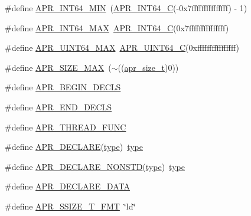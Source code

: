\begin{DoxyCompactItemize}
\item 
\#define \hyperlink{group__apr__platform_gaf371ae92dbf0fed20801cf279cd85f1a}{A\+P\+R\+\_\+\+I\+N\+T64\+\_\+\+M\+IN}~(\hyperlink{group__apr__platform_gaae749817bb595cd5dcb9c17c119ddb13}{A\+P\+R\+\_\+\+I\+N\+T64\+\_\+C}(-\/0x7fffffffffffffff) -\/ 1)
\item 
\#define \hyperlink{group__apr__platform_ga3b25669924dcfa853cd6ea3395c8717f}{A\+P\+R\+\_\+\+I\+N\+T64\+\_\+\+M\+AX}~\hyperlink{group__apr__platform_gaae749817bb595cd5dcb9c17c119ddb13}{A\+P\+R\+\_\+\+I\+N\+T64\+\_\+C}(0x7fffffffffffffff)
\item 
\#define \hyperlink{group__apr__platform_ga2d20379176b15b8b0598992df3def796}{A\+P\+R\+\_\+\+U\+I\+N\+T64\+\_\+\+M\+AX}~\hyperlink{group__apr__platform_gaede133b7384b6a7a08c51cf1fa9c4001}{A\+P\+R\+\_\+\+U\+I\+N\+T64\+\_\+C}(0xffffffffffffffff)
\item 
\#define \hyperlink{group__apr__platform_gab5865d64b134a3924014837dd44627a7}{A\+P\+R\+\_\+\+S\+I\+Z\+E\+\_\+\+M\+AX}~($\sim$((\hyperlink{group__apr__platform_gaaa72b2253f6f3032cefea5712a27540e}{apr\+\_\+size\+\_\+t})0))
\item 
\#define \hyperlink{group__apr__platform_gaa046c9c51a1af394db3a34dec1972630}{A\+P\+R\+\_\+\+B\+E\+G\+I\+N\+\_\+\+D\+E\+C\+LS}
\item 
\#define \hyperlink{group__apr__platform_ga32d22bd9e118350c750a9c9c05bdeef8}{A\+P\+R\+\_\+\+E\+N\+D\+\_\+\+D\+E\+C\+LS}
\item 
\#define \hyperlink{group__apr__platform_gade8f829f9bd98fd4386894acf72edd7c}{A\+P\+R\+\_\+\+T\+H\+R\+E\+A\+D\+\_\+\+F\+U\+NC}
\item 
\#define \hyperlink{group__apr__platform_gad7b91b811a172bfa802603c2fb688f98}{A\+P\+R\+\_\+\+D\+E\+C\+L\+A\+RE}(\hyperlink{pcre_8txt_a2463fbbe8b0c90b90db12195e1edaa5d}{type})~\hyperlink{pcre_8txt_a2463fbbe8b0c90b90db12195e1edaa5d}{type}
\item 
\#define \hyperlink{group__apr__platform_ga3ad5e45fabbda0ec5f106c334f1a0ae5}{A\+P\+R\+\_\+\+D\+E\+C\+L\+A\+R\+E\+\_\+\+N\+O\+N\+S\+TD}(\hyperlink{pcre_8txt_a2463fbbe8b0c90b90db12195e1edaa5d}{type})~\hyperlink{pcre_8txt_a2463fbbe8b0c90b90db12195e1edaa5d}{type}
\item 
\#define \hyperlink{group__apr__platform_ga16a1a3d65c57ce052fffb63190b1cadc}{A\+P\+R\+\_\+\+D\+E\+C\+L\+A\+R\+E\+\_\+\+D\+A\+TA}
\item 
\#define \hyperlink{group__apr__platform_gabac6108769f9b7deded82e73f3cd4060}{A\+P\+R\+\_\+\+S\+S\+I\+Z\+E\+\_\+\+T\+\_\+\+F\+MT}~\char`\"{}ld\char`\"{}

\end{DoxyCompactItemize}
